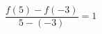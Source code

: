 \documentclass[preview]{standalone}
\begin{document}
\begin{align*}
\dfrac{f(5) - f(-3)}{5 - (-3)} = 1
\end{align*}
\end{document}

